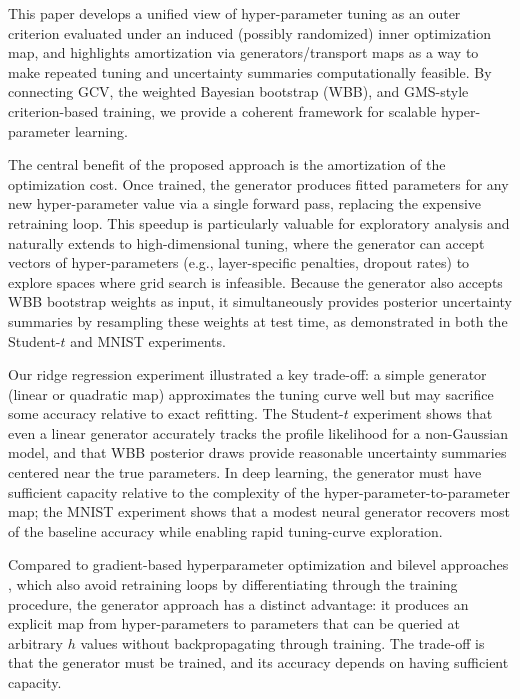 \documentclass[12pt]{article}
\begin{document}
This paper develops a unified view of hyper-parameter tuning as an outer criterion evaluated under an induced (possibly randomized) inner optimization map, and highlights amortization via generators/transport maps as a way to make repeated tuning and uncertainty summaries computationally feasible. By connecting GCV, the weighted Bayesian bootstrap (WBB), and GMS-style criterion-based training, we provide a coherent framework for scalable hyper-parameter learning.

The central benefit of the proposed approach is the amortization of the optimization cost. Once trained, the generator produces fitted parameters for any new hyper-parameter value via a single forward pass, replacing the expensive retraining loop. This speedup is particularly valuable for exploratory analysis and naturally extends to high-dimensional tuning, where the generator can accept vectors of hyper-parameters (e.g., layer-specific penalties, dropout rates) to explore spaces where grid search is infeasible. Because the generator also accepts WBB bootstrap weights as input, it simultaneously provides posterior uncertainty summaries by resampling these weights at test time, as demonstrated in both the Student-$t$ and MNIST experiments.

Our ridge regression experiment illustrated a key trade-off: a simple generator (linear or quadratic map) approximates the tuning curve well but may sacrifice some accuracy relative to exact refitting. The Student-$t$ experiment shows that even a linear generator accurately tracks the profile likelihood for a non-Gaussian model, and that WBB posterior draws provide reasonable uncertainty summaries centered near the true parameters. In deep learning, the generator must have sufficient capacity relative to the complexity of the hyper-parameter-to-parameter map; the MNIST experiment shows that a modest neural generator recovers most of the baseline accuracy while enabling rapid tuning-curve exploration.

Compared to gradient-based hyperparameter optimization \citep{maclaurin2015gradient} and bilevel approaches \citep{franceschi2018bilevel}, which also avoid retraining loops by differentiating through the training procedure, the generator approach has a distinct advantage: it produces an explicit map from hyper-parameters to parameters that can be queried at arbitrary $h$ values without backpropagating through training. The trade-off is that the generator must be trained, and its accuracy depends on having sufficient capacity.
\end{document}
